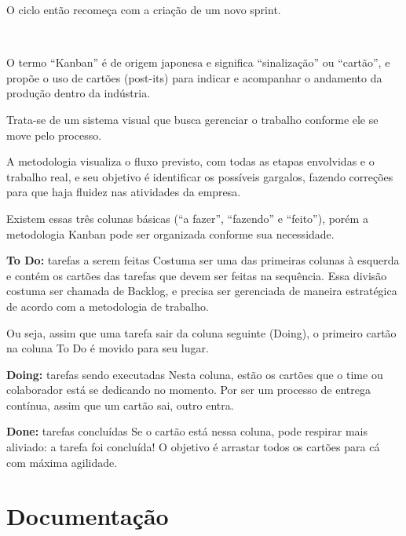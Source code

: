 \begin{enumerate}
\begin{citacao}
O ciclo então recomeça com a criação de um novo sprint.
        \end{citacao}
        \\
        \begin{citacao}
            O termo “Kanban” é de origem japonesa e significa “sinalização” ou “cartão”, e propõe o uso de cartões (post-its) para indicar e acompanhar o andamento da produção dentro da indústria.

    Trata-se de um sistema visual que busca gerenciar o trabalho conforme ele se move pelo processo.

    A metodologia visualiza o fluxo previsto, com todas as etapas envolvidas e o trabalho real, e seu objetivo é identificar os possíveis gargalos, fazendo correções para que haja fluidez nas atividades da empresa.

    Existem essas três colunas básicas (“a fazer”, “fazendo” e “feito”), porém a metodologia Kanban pode ser organizada conforme sua necessidade.

    \textbf{To Do:} tarefas a serem feitas
Costuma ser uma das primeiras colunas à esquerda e contém os cartões das tarefas que devem ser feitas na sequência. Essa divisão costuma ser chamada de Backlog, e precisa ser gerenciada de maneira estratégica de acordo com a metodologia de trabalho.

Ou seja, assim que uma tarefa sair da coluna seguinte (Doing), o primeiro cartão na coluna To Do é movido para seu lugar.

    \textbf{Doing:} tarefas sendo executadas
Nesta coluna, estão os cartões que o time ou colaborador está se dedicando no momento. Por ser um processo de entrega contínua, assim que um cartão sai, outro entra.

    \textbf{Done:} tarefas concluídas
Se o cartão está nessa coluna, pode respirar mais aliviado: a tarefa foi concluída! O objetivo é arrastar todos os cartões para cá com máxima agilidade.
        \end{citacao}  

\end{enumerate}

\section{Documentação}
